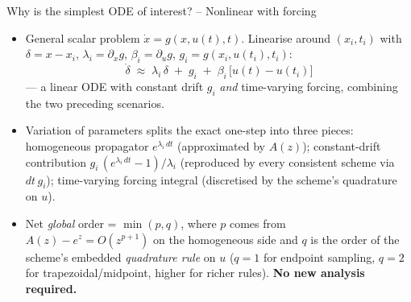 \documentclass[11pt,aspectratio=169]{beamer}
\begin{document}
\begin{frame}{Why is the simplest ODE of interest? -- Nonlinear with forcing}

\begin{itemize}

\item General scalar problem $\dot x = g(x, u(t), t)$. Linearise around
  $(x_i, t_i)$ with $\delta = x - x_i$, $\lambda_i = \partial_x g$,
  $\beta_i = \partial_u g$, $g_i = g(x_i, u(t_i), t_i)$:
  \[
  \dot\delta \;\approx\; \lambda_i\,\delta \;+\; g_i
  \;+\; \beta_i\,\bigl[u(t) - u(t_i)\bigr]
  \]
  — a linear ODE with constant drift $g_i$ \emph{and} time-varying
  forcing, combining the two preceding scenarios.\newline

\item Variation of parameters splits the exact one-step into three
  pieces: homogeneous propagator $e^{\lambda_i\, dt}$ (approximated
  by $A(z)$); constant-drift contribution $g_i\,(e^{\lambda_i\, dt}{-}1)/\lambda_i$
  (reproduced by every consistent scheme via $dt\,g_i$); time-varying
  forcing integral (discretised by the scheme's quadrature on $u$).\newline

\item Net \emph{global} order = $\min(p, q)$, where $p$ comes from
  $A(z) - e^z = O(z^{p+1})$ on the homogeneous side and $q$ is the
  order of the scheme's embedded \emph{quadrature rule} on $u$
  ($q=1$ for endpoint sampling, $q=2$ for trapezoidal/midpoint,
  higher for richer rules). \textbf{No new analysis required.}

\end{itemize}

\end{frame}
\end{document}
